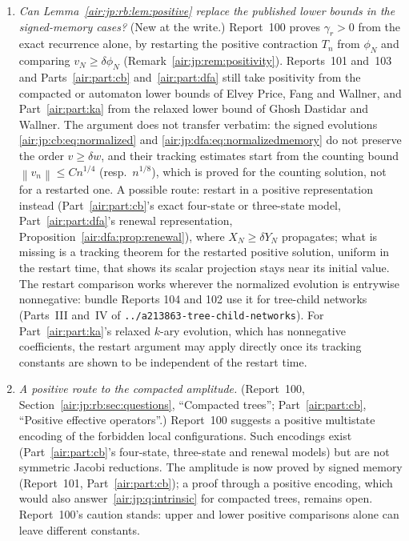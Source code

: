 \documentclass[11pt,letterpaper]{article}
\numberwithin{equation}{section}
\theoremstyle{remark}
\newcommand{\norm}[1]{\left\lVert#1\right\rVert}
\newcommand{\repopath}[1]{\nolinkurl{#1}}
\begin{document}
\begin{enumerate}[label=\textbf{V.\arabic*}, ref=V.\arabic*, leftmargin=*]
\item\label{air:jp:q:intrinsic} \emph{Can Lemma~\ref{air:jp:rb:lem:positive} replace the published lower bounds in the signed-memory cases?} (New at the write.) Report~100 proves $\gamma_r>0$ from the exact recurrence alone, by restarting the positive contraction $T_n$ from $\phi_N$ and comparing $v_N\ge\delta\phi_N$ (Remark~\ref{air:jp:rem:positivity}). Reports~101 and~103 and Parts~\ref{air:part:cb} and~\ref{air:part:dfa} still take positivity from the compacted or automaton lower bounds of Elvey Price, Fang and Wallner, and Part~\ref{air:part:ka} from the relaxed lower bound of Ghosh Dastidar and Wallner. The argument does not transfer verbatim: the signed evolutions \eqref{air:jp:cb:eq:normalized} and \eqref{air:jp:dfa:eq:normalizedmemory} do not preserve the order $v\ge\delta w$, and their tracking estimates start from the counting bound $\norm{v_n}\le Cn^{1/4}$ (resp.\ $n^{1/8}$), which is proved for the counting solution, not for a restarted one. A possible route: restart in a positive representation instead (Part~\ref{air:part:cb}'s exact four-state or three-state model, Part~\ref{air:part:dfa}'s renewal representation, Proposition~\ref{air:dfa:prop:renewal}), where $X_N\ge\delta Y_N$ propagates; what is missing is a tracking theorem for the restarted positive solution, uniform in the restart time, that shows its scalar projection stays near its initial value. The restart comparison works wherever the normalized evolution is entrywise nonnegative: bundle Reports 104 and 102 use it for tree-child networks (Parts~III and~IV of \repopath{../a213863-tree-child-networks}). For Part~\ref{air:part:ka}'s relaxed $k$-ary evolution, which has nonnegative coefficients, the restart argument may apply directly once its tracking constants are shown to be independent of the restart time.
\item\label{air:jp:q:positive} \emph{A positive route to the compacted amplitude.} (Report~100, Section~\ref{air:jp:rb:sec:questions}, ``Compacted trees''; Part~\ref{air:part:cb}, ``Positive effective operators''.) Report~100 suggests a positive multistate encoding of the forbidden local configurations. Such encodings exist (Part~\ref{air:part:cb}'s four-state, three-state and renewal models) but are not symmetric Jacobi reductions. The amplitude is now proved by signed memory (Report~101, Part~\ref{air:part:cb}); a proof through a positive encoding, which would also answer~\ref{air:jp:q:intrinsic} for compacted trees, remains open. Report~100's caution stands: upper and lower positive comparisons alone can leave different constants.

\end{enumerate}
\end{document}
